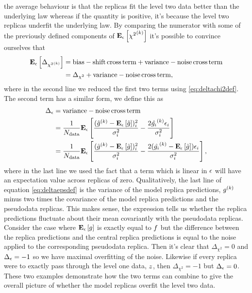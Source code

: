 the average behaviour is that the replicas fit the level two data better than
the underlying law whereas if the quantity is positive, it's because the
level two replicas underfit the underlying law. By comparing the numerator with
some of the previously defined components of $\mathbf{E}_{\epsilon}\left[ {\chi^2}^{(k)} \right]$ it's possible to
convince ourselves that
\begin{equation}
    \begin{split}
        \mathbf{E}_{\epsilon}\left[ \Delta_{{\chi^2}^{(k)}} \right] &= {\rm bias} - {\rm shift \, cross \, term} + {\rm variance} - {\rm noise \, cross \, term} \\
        &= \Delta_{\chi^2} + {\rm variance} - {\rm noise \, cross \, term},
    \end{split}
\end{equation}
where in the second line we reduced the first two terms using
\eqref{eq:deltachi2def}. The second term has a similar form, we define this as
\begin{equation}\label{eq:deltaepsdef}
    \begin{split}
        \Delta_{\epsilon} &= {\rm variance} - {\rm noise \, cross \, term} \\
        &= \frac{1}{N_{\rm data}}\mathbf{E}_{\epsilon}\left[  \frac{(\hat{g}^{(k)} - \mathbf{E}_{\epsilon}\left[ \hat{g} \right])_i^2}{\sigma^{2}_i}
        - \frac{2\hat{g_i}^{(k)} \epsilon_i}{\sigma^{2}_i} \right] \\
        &= \frac{1}{N_{\rm data}}\mathbf{E}_{\epsilon}\left[  \frac{(\hat{g}^{(k)} - \mathbf{E}_{\epsilon}\left[ \hat{g} \right])_i^2}{\sigma^{2}_i}
        - \frac{2(\hat{g_i}^{(k)} - \mathbf{E}_{\epsilon}\left[ \hat{g} \right]) \epsilon_i}{\sigma^{2}_i} \right],
    \end{split}
\end{equation}
where in the last line we used the fact that a term which is linear in $\epsilon$
will have an expectation value across replicas of zero. Qualitatively, the last
line of equation \eqref{eq:deltaepsdef} is the variance of the model replica
predictions, $g^{(k)}$ minus two times the covariance of the model
replica predictions and the pseudodata replicas. This makes sense, the expression
tells us whether the replica predictions fluctuate about their mean covariantly
with the pseudodata replicas. Consider the case where $\mathbf{E}_{\epsilon}\left[ g \right]$ is exactly
equal to $f$ but the difference between the replica predictions and the
central replica predictions is equal to the noise applied to the corresponding
pseudodata replica. Then it's clear that $\Delta_{\chi^2}=0$ and $\Delta_{\epsilon}=-1$
so we have maximal overfitting of the noise. Likewise if every replica were to
exactly pass through the level one data, $z$, then $\Delta_{\chi^2}=-1$
but $\Delta_{\epsilon}=0$. These two examples demonstrate how the two terms can combine
to give the overall picture of whether the model replicas overfit the level two
data.

